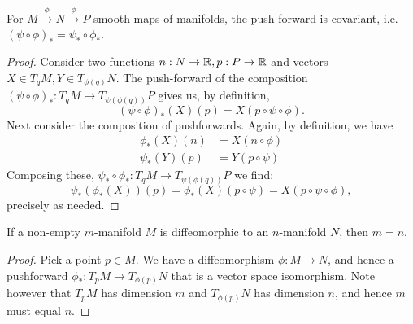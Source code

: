 \documentclass{../../mathnotes}
\begin{document}
\begin{prop}
    For $M\overset{\phi}{\to}N\overset{\phi}{\to}P$ smooth maps of manifolds, the push-forward is covariant, i.e. $(\psi\circ\phi)_*=\psi_*\circ\phi_*$.
\end{prop}

\begin{proof}
    Consider two functions $n:N\to\mathbb{R},p:P\to \mathbb{R}$ and vectors $X\in T_qM,Y\in T_{\phi(q)}N$. The push-forward of the composition $(\psi\circ\phi)_*:T_qM\to T_{\psi(\phi(q))}P$
    gives us, by definition,
    \[
        (\psi\circ\phi)_*(X)(p)=X(p\circ\psi\circ\phi).
    \]
    Next consider the composition of pushforwards. Again, by definition, we have 
    \begin{align*}
        \phi_*(X)(n)&=X(n\circ\phi)\\
        \psi_*(Y)(p)&=Y(p\circ\psi)
    \end{align*}
    Composing these, $\psi_*\circ\phi_*:T_qM\to T_{\psi(\phi(q))}P$ we find:
    \[
        \psi_*(\phi_*(X))(p)=\phi_*(X)(p\circ\psi)=X(p\circ\psi\circ\phi),
    \]
    precisely as needed.
\end{proof}

\begin{prop}
    If a non-empty $m$-manifold $M$ is diffeomorphic to an $n$-manifold $N$, then $m=n$.
\end{prop}
\begin{proof}
    Pick a point $p\in M$. We have a diffeomorphism $\phi: M\to N$, and hence a pushforward $\phi_*: T_pM\to T_{\phi(p)}N$ that is a vector space isomorphism.
    Note however that $T_pM$ has dimension $m$ and $T_{\phi(p)}N$ has dimension $n$, and hence $m$ must equal $n$.
\end{proof}
\end{document}
